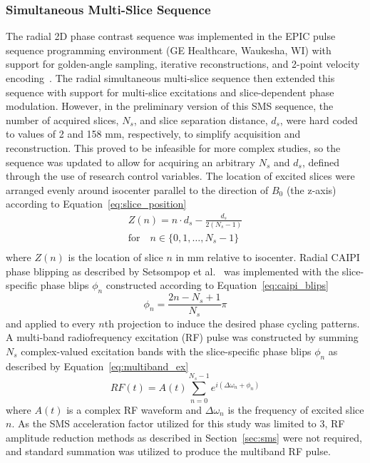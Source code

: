\subsubsection{Simultaneous Multi-Slice Sequence}
The radial 2D phase contrast sequence was implemented in the EPIC pulse sequence programming environment (GE Healthcare, Waukesha, WI) with support for golden-angle sampling, iterative reconstructions, and 2-point velocity encoding~\cite{fengGoldenAngleRadialMRI2022}. The radial simultaneous multi-slice sequence then extended this sequence with support for multi-slice excitations and slice-dependent phase modulation. However, in the preliminary version of this SMS sequence, the number of acquired slices, $N_s$, and slice separation distance, $d_s$, were hard coded to values of 2 and 158 mm, respectively, to simplify acquisition and reconstruction. This proved to be infeasible for more complex studies, so the sequence was updated to allow for acquiring an arbitrary $N_s$ and $d_s$, defined through the use of research control variables. The location of excited slices were arranged evenly around isocenter parallel to the direction of $B_0$ (the z-axis) according to Equation~\ref{eq:slice_position} 
\begin{equation}
    \begin{aligned}
        Z(n) = n\cdot d_s - \frac{d_s}{2(N_s - 1)} \\
        \text{for} \quad  n \in \{0, 1, \dots, N_s - 1\}\\
    \end{aligned}
    \label{eq:slice_position}
\end{equation}
where $Z(n)$ is the location of slice $n$ in mm relative to isocenter. Radial CAIPI phase blipping as described by Setsompop et al.~\cite{setsompopBlippedControlledAliasingParallel2012a} was implemented with the slice-specific phase blips $\phi_n$ constructed according to Equation~\ref{eq:caipi_blips} 
\begin{equation}
    \phi_n = \frac{2n-N_s+1}{N_s}\pi
    \label{eq:caipi_blips}
\end{equation}
and applied to every $n$th projection to induce the desired phase cycling patterns. A multi-band radiofrequency excitation (RF) pulse was constructed by summing $N_s$ complex-valued excitation bands with the slice-specific phase blips $\phi_n$ as described by Equation~\ref{eq:multiband_ex} 
\begin{equation}
    RF(t) = A(t) \sum_{n=0}^{N_s-1} e^{i(\Delta \omega_n + \phi_n)} 
    \label{eq:multiband_ex}
\end{equation}
where $A(t)$ is a complex RF waveform and $\Delta \omega_n$ is the frequency of excited slice $n$. As the SMS acceleration factor utilized for this study was limited to 3, RF amplitude reduction methods as described in Section~\ref{sec:sms} were not required, and standard summation was utilized to produce the multiband RF pulse.

